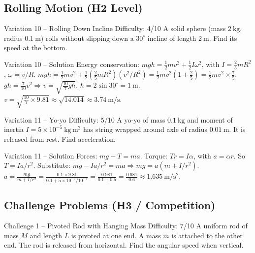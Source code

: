 \documentclass[11pt]{beamer}
\begin{document}
\subsection{Rolling Motion (H2 Level)}

\begin{frame}[shrink=15]{Variation 10 – Rolling Down Incline \hfill Difficulty: 4/10}
A solid sphere (mass $2\ \mathrm{kg}$, radius $0.1\ \mathrm{m}$) rolls without slipping down a $30^\circ$ incline of length $2\ \mathrm{m}$. Find its speed at the bottom.
\end{frame}

\begin{frame}{Variation 10 – Solution}
Energy conservation: $mgh = \frac12 m v^2 + \frac12 I \omega^2$, with $I = \frac25 m R^2$, $\omega = v/R$.
$mgh = \frac12 m v^2 + \frac12 (\frac25 m R^2)(v^2/R^2) = \frac12 m v^2 (1 + \frac25) = \frac12 m v^2 \times \frac75$.
$gh = \frac{7}{10} v^2 \Rightarrow v = \sqrt{\frac{10}{7} g h}$.
$h = 2\sin30^\circ = 1\ \mathrm{m}$. $v = \sqrt{\frac{10}{7}\times9.81} \approx \sqrt{14.014} \approx 3.74\ \mathrm{m/s}$.
\end{frame}

\begin{frame}[shrink=15]{Variation 11 – Yo-yo \hfill Difficulty: 5/10}
A yo-yo of mass $0.1\ \mathrm{kg}$ and moment of inertia $I = 5\times10^{-5}\ \mathrm{kg\,m^2}$ has string wrapped around axle of radius $0.01\ \mathrm{m}$. It is released from rest. Find acceleration.
\end{frame}

\begin{frame}{Variation 11 – Solution}
Forces: $mg - T = ma$. Torque: $T r = I \alpha$, with $a = \alpha r$. So $T = I a / r^2$.
Substitute: $mg - I a / r^2 = ma \Rightarrow mg = a (m + I/r^2)$.
$a = \frac{mg}{m + I/r^2} = \frac{0.1\times9.81}{0.1 + 5\times10^{-5}/10^{-4}} = \frac{0.981}{0.1 + 0.5} = \frac{0.981}{0.6} \approx 1.635\ \mathrm{m/s^2}$.
\end{frame}

\subsection{Challenge Problems (H3 / Competition)}

\begin{frame}[shrink=15]{Challenge 1 – Pivoted Rod with Hanging Mass \hfill Difficulty: 7/10}
A uniform rod of mass $M$ and length $L$ is pivoted at one end. A mass $m$ is attached to the other end. The rod is released from horizontal. Find the angular speed when vertical.
\end{frame}
\end{document}
